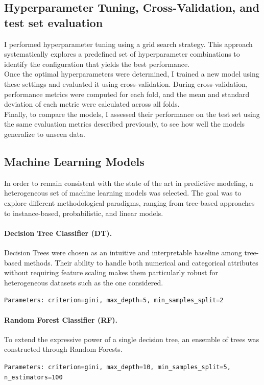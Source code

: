 \subsection{Hyperparameter Tuning, Cross-Validation, and test set evaluation}
I performed hyperparameter tuning using a grid search strategy. This approach systematically explores a predefined set of hyperparameter combinations to identify the configuration that yields the best performance.\\

\noindent Once the optimal hyperparameters were determined, I trained a new model using these settings and evaluated it using cross-validation. During cross-validation, performance metrics were computed for each fold, and the mean and standard deviation of each metric were calculated across all folds.\\

\noindent
Finally, to compare the models, I assessed their performance on the test set using the same evaluation metrics described previously, to see how well the models generalize to unseen data. 


\subsection{Machine Learning Models}
In order to remain consistent with the state of the art in predictive modeling, a heterogeneous set of machine learning models was selected. The goal was to explore different methodological paradigms, ranging from tree-based approaches to instance-based, probabilistic, and linear models. 

\paragraph{Decision Tree Classifier (DT).}
Decision Trees were chosen as an intuitive and interpretable baseline among tree-based methods. Their ability to handle both numerical and categorical attributes without requiring feature scaling makes them particularly robust for heterogeneous datasets such as the one considered.
\begin{tcolorbox}[colback=gray!5!white,colframe=gray!50!black,
                  boxrule=0.5pt,arc=2pt, left=1mm, right=1mm, top=0.5mm, bottom=0.5mm]
\texttt{Parameters: criterion=gini, max\_depth=5, min\_samples\_split=2}
\end{tcolorbox}

\paragraph{Random Forest Classifier (RF).}
To extend the expressive power of a single decision tree, an ensemble of trees was constructed through Random Forests. 
\begin{tcolorbox}[colback=gray!5!white,colframe=gray!50!black,
                  boxrule=0.5pt,arc=2pt, left=1mm, right=1mm, top=0.5mm, bottom=0.5mm]
\texttt{Parameters: criterion=gini, max\_depth=10, min\_samples\_split=5, n\_estimators=100}
\end{tcolorbox}

